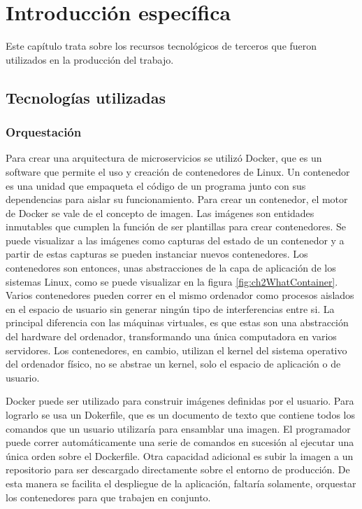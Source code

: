 \chapter{Introducción específica} %

\label{Chapter2}

Este capítulo trata sobre los recursos tecnológicos de terceros que fueron utilizados en la producción del trabajo.

\section{Tecnologías utilizadas}

\subsection{Orquestación}
Para crear una arquitectura de microservicios se utilizó Docker, que es un software que permite el uso y creación de contenedores de Linux.
Un contenedor es una unidad que empaqueta el código de un programa junto con sus dependencias para aislar su funcionamiento.
Para crear un contenedor, el motor de Docker se vale de el concepto de imagen.
Las imágenes son entidades inmutables que cumplen la función de ser plantillas para crear contenedores.
Se puede visualizar a las imágenes como capturas del estado de un contenedor y a partir de estas capturas se pueden instanciar nuevos contenedores.
Los contenedores son entonces, unas abstracciones de la capa de aplicación de los sistemas Linux, como se puede visualizar en la figura \ref{fig:ch2WhatContainer}.
Varios contenedores pueden correr en el mismo ordenador como procesos aislados en el espacio de usuario sin generar ningún tipo de interferencias entre si.
La principal diferencia con las máquinas virtuales, es que estas son una abstracción del hardware del ordenador, transformando una única computadora en varios servidores.
Los contenedores, en cambio, utilizan el kernel del sistema operativo del ordenador físico, no se abstrae un kernel, solo el espacio de aplicación o de usuario.

Docker puede ser utilizado para construir imágenes definidas por el usuario.
Para lograrlo se usa un Dokerfile, que es un documento de texto que contiene todos los comandos que un usuario utilizaría para ensamblar una imagen.
El programador puede correr automáticamente una serie de comandos en sucesión al ejecutar una única orden sobre el Dockerfile.
Otra capacidad adicional es subir la imagen a un repositorio para ser descargado directamente sobre el entorno de producción.
De esta manera se facilita el despliegue de la aplicación, faltaría solamente, orquestar los contenedores para que trabajen en conjunto. 

